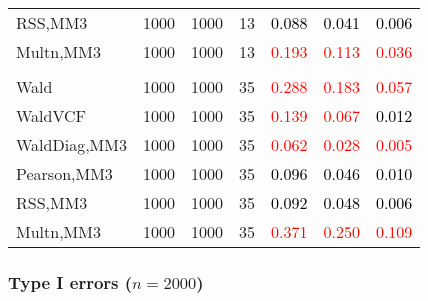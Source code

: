 \documentclass[
]{article}
\begin{document}
\begin{table}[H]
{\begin{tabular}[t]{lrrrrrr}
\hspace{1em}RSS,MM3 & 1000 & 1000 & 13 & \textcolor{black}{0.088} & \textcolor{black}{0.041} & \textcolor{black}{0.006}\\
\hspace{1em}Multn,MM3 & 1000 & 1000 & 13 & \textcolor{red}{0.193} & \textcolor{red}{0.113} & \textcolor{red}{0.036}\\
\addlinespace[0.3em]
\multicolumn{7}{l}{\textbf{3F 15V}}\\
\hspace{1em}Wald & 1000 & 1000 & 35 & \textcolor{red}{0.288} & \textcolor{red}{0.183} & \textcolor{red}{0.057}\\
\hspace{1em}WaldVCF & 1000 & 1000 & 35 & \textcolor{red}{0.139} & \textcolor{red}{0.067} & \textcolor{black}{0.012}\\
\hspace{1em}WaldDiag,MM3 & 1000 & 1000 & 35 & \textcolor{red}{0.062} & \textcolor{red}{0.028} & \textcolor{red}{0.005}\\
\hspace{1em}Pearson,MM3 & 1000 & 1000 & 35 & \textcolor{black}{0.096} & \textcolor{black}{0.046} & \textcolor{black}{0.010}\\
\hspace{1em}RSS,MM3 & 1000 & 1000 & 35 & \textcolor{black}{0.092} & \textcolor{black}{0.048} & \textcolor{black}{0.006}\\
\hspace{1em}Multn,MM3 & 1000 & 1000 & 35 & \textcolor{red}{0.371} & \textcolor{red}{0.250} & \textcolor{red}{0.109}\\
\bottomrule
\end{tabular}}
\endgroup{}
\end{table}

\hypertarget{type-i-errors-n2000-2}{%
\subsubsection{\texorpdfstring{Type I errors
(\(n=2000\))}{Type I errors (n=2000)}}\label{type-i-errors-n2000-2}}
\end{document}

